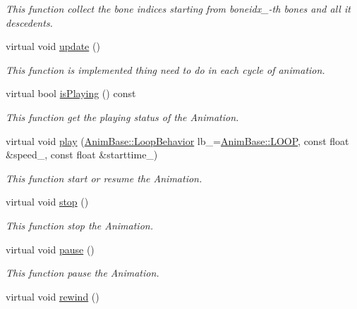 \begin{DoxyCompactItemize}
\begin{DoxyCompactList}\small\item\em This function collect the bone indices starting from boneidx\+\_\+-\/th bones and all it descedents. \end{DoxyCompactList}\item 
virtual void \hyperlink{class_magnum_1_1_skeletal_anim_blender_ad648bb5f97296b7e5ac203967c32a66b}{update} ()
\begin{DoxyCompactList}\small\item\em This function is implemented thing need to do in each cycle of animation. \end{DoxyCompactList}\item 
virtual bool \hyperlink{class_magnum_1_1_skeletal_anim_blender_a937aa755ef6e880e7779b3a67afb3ca1}{is\+Playing} () const 
\begin{DoxyCompactList}\small\item\em This function get the playing status of the Animation. \end{DoxyCompactList}\item 
virtual void \hyperlink{class_magnum_1_1_skeletal_anim_blender_a1cecc3b4cb9a378ff1fac5583cbf7f89}{play} (\hyperlink{class_magnum_1_1_anim_base_ad6b3de9518d395df5ca9865f268ec581}{Anim\+Base\+::\+Loop\+Behavior} lb\+\_\+=\hyperlink{class_magnum_1_1_anim_base_ad6b3de9518d395df5ca9865f268ec581a8b877225f523af406db47b5a700d443f}{Anim\+Base\+::\+L\+O\+OP}, const float \&speed\+\_, const float \&starttime\+\_)
\begin{DoxyCompactList}\small\item\em This function start or resume the Animation. \end{DoxyCompactList}\item 
virtual void \hyperlink{class_magnum_1_1_skeletal_anim_blender_a061b003b7492b5c91e19e4c9aca1621a}{stop} ()
\begin{DoxyCompactList}\small\item\em This function stop the Animation. \end{DoxyCompactList}\item 
virtual void \hyperlink{class_magnum_1_1_skeletal_anim_blender_a3adb5a40905ac4f395af18890215e249}{pause} ()
\begin{DoxyCompactList}\small\item\em This function pause the Animation. \end{DoxyCompactList}\item 
virtual void \hyperlink{class_magnum_1_1_skeletal_anim_blender_ad53119fea64b7fc6a1b1ba838d39b7cc}{rewind} ()

\end{DoxyCompactItemize}
